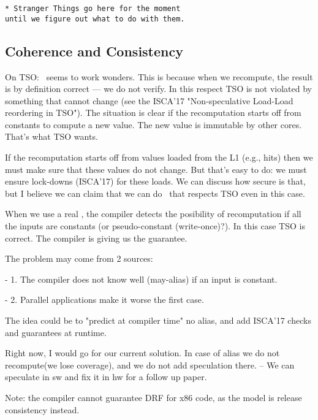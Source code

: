 \begin{verbatim}
* Stranger Things go here for the moment 
until we figure out what to do with them.
 \end{verbatim}


\subsection{Coherence and Consistency}
On TSO:
\recomp\ seems to work wonders. This is because when we recompute,
the result is by definition correct --- we do not verify.
In this respect TSO is not violated by something that cannot change (see
the ISCA'17 "Non-speculative Load-Load reordering in TSO").
The situation is clear if the recomputation starts off from constants to
compute a new value. The new value is immutable by other cores.
That's what TSO wants.

If the recomputation starts off from values loaded from the L1 (e.g.,
hits) then we must make sure that these values do not change.
But that's easy to do: we must ensure lock-downs (ISCA'17) for these
loads. We can discuss how secure is that, but I believe we can claim
that we can do \recomp\ that respects TSO even in this case. 

When we use a real \recomp, the compiler detects the posibility of recomputation if all the inputs are constants (or pseudo-constant (write-once)?). In this case TSO is correct. The compiler is giving us the guarantee.

The problem may come from 2 sources:

- 1. The compiler does not know well (may-alias) if an input is constant.

- 2. Parallel applications make it worse the first case.

The idea could be to "predict at compiler time" no alias, and add ISCA'17 checks and guarantees at runtime.

Right now, I would go for our current solution. In case of alias we do not recompute(we lose coverage), and we do not add speculation there. -- We can speculate in sw and fix it in hw for a follow up paper. 

Note: the compiler cannot guarantee DRF for x86 code, as the model is release consistency instead. 

